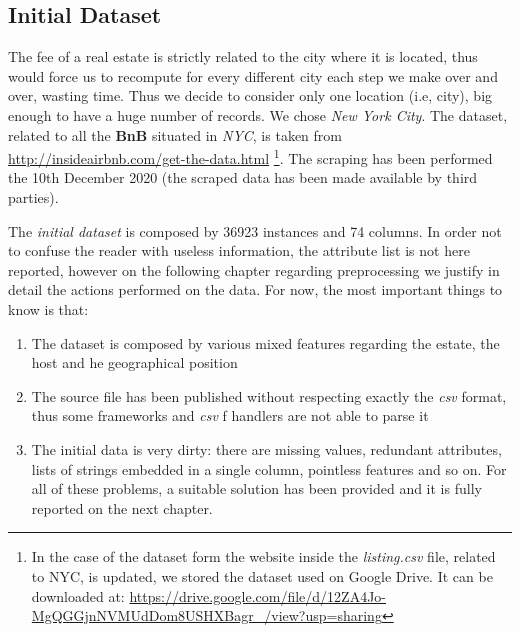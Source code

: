 \subsection{Initial Dataset}
The fee of a real estate is strictly related to the city where it is located, thus would force us to recompute for every different city each step we make over and over, wasting time. Thus we decide to consider only one location (i.e, city), big enough to have a huge number of records. We chose \textit{New York City}.
The dataset, related to all the \textbf{BnB} situated in \textit{NYC}, is taken from \url{http://insideairbnb.com/get-the-data.html} \footnote{In the case of the dataset form the website inside the \textit{listing.csv} file, related to NYC, is updated, we stored the dataset used on Google Drive. It can be downloaded at: \url{https://drive.google.com/file/d/12ZA4Jo-MgQGGjnNVMUdDom8USHXBagr_/view?usp=sharing}}. The scraping has been performed the 10th December 2020 (the scraped data has been made available by third parties).

The \textit{initial dataset} is composed by 36923 instances and 74 columns. In order not to confuse the reader with useless information, the attribute list is not here reported, however on the following chapter regarding preprocessing we justify in detail the actions performed on the data. For now, the most important things to know is that:

\begin{enumerate}
	\item The dataset is composed by various mixed features regarding the estate, the host and he geographical position
	\item The source file has been published without respecting exactly the \textit{csv} format, thus some frameworks and \textit{csv} f handlers are not able to parse it
	\item The initial data is very dirty: there are missing values, redundant attributes, lists of strings embedded in a single column, pointless features and so on. For all of these problems, a suitable solution has been provided and it is fully reported on the next chapter.
\end{enumerate}

\medskip 
